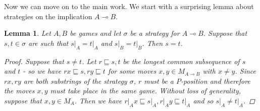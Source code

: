 \documentclass[11pt]{article} %
\theoremstyle{plain} %
\newtheorem{lemma}[theorem]{Lemma}
\theoremstyle{definition} %
\theoremstyle{note}
\theoremstyle{exercisestyle}
\renewcommand{\implies}{\multimap}
\newcommand{\prefix}{\sqsubseteq}
\begin{document}
Now we can move on to the main work.  We start with a surprising lemma about strategies on the implication $A\implies B$.  

\begin{lemma}
  \label{PlayInStrategyDeterminedByComponents}
  Let $A,B$ be games and let $\sigma$ be a strategy for $A\implies B$.  Suppose that $s,t\in\sigma$ are such that $s\vert_A=t\vert_A$ and $s\vert_B=t\vert_B$.  Then $s=t$.
  \begin{proof}
    Suppose that $s\ne t$.  Let $r\prefix s,t$ be the longest common subsequence of $s$ and $t$ - so we have $rx\prefix s, ry\prefix t$ for some moves $x,y\in M_{A\implies B}$ with $x\ne y$.  Since $rx,ry$ are both substrings of the strategy $\sigma$, $r$ must be a $P$-position and therefore the moves $x,y$ must take place in the same game.  Without loss of generality, suppose that $x,y\in M_A$.  Then we have $r\vert_Ax\prefix s\vert_A,r\vert_Ay\prefix t\vert_A$ and so $s\vert_A\ne t\vert_A$.
  \end{proof}
\end{lemma}
\end{document}
